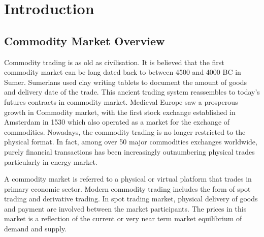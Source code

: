 
\chapter{Introduction} %

\label{Chapter1} %


\newcommand{\keyword}[1]{\textbf{#1}}
\newcommand{\tabhead}[1]{\textbf{#1}}
\newcommand{\code}[1]{\texttt{#1}}
\newcommand{\file}[1]{\texttt{\bfseries#1}}
\newcommand{\option}[1]{\texttt{\itshape#1}}

\section{Commodity Market Overview}
Commodity trading is as old as civilisation. It is believed that the first commodity market can be long dated back to between 4500 and 4000 BC in Sumer. Sumerians used clay writing tablets to document the amount of goods and delivery date of the trade. This ancient trading system reassembles to today's futures contracts in commodity market. Medieval Europe saw a prosperous growth in Commodity market, with the first stock exchange established in Amsterdam in 1530 which also operated as a market for the exchange of commodities. Nowadays, the commodity trading is no longer restricted to the physical format. In fact, among over 50 major commodities exchanges worldwide, purely financial transactions has been increasingly outnumbering physical trades particularly in energy market. 

A commodity market is referred to a physical or virtual platform that trades in primary economic sector. Modern commodity trading includes the form of spot trading and derivative trading. In spot trading market, physical delivery of goods and payment are involved between the market participants. The prices in this market is a reflection of the current or very near term market equilibrium of demand and supply. 

